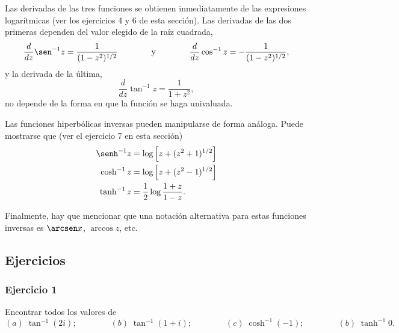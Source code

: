 \documentclass[a4paper]{report}
\begin{document}
Las derivadas de las tres funciones se obtienen inmediatamente de las expresiones logarítmicas (ver los ejercicios 4 y 6 de esta sección). Las derivadas de las dos primeras dependen del valor elegido de la raíz cuadrada,
\begin{equation}\label{eq:inverse_trigonometric_derivatives_sin_cos}
 \frac{d}{dz}\sen^{-1}z=\frac{1}{(1-z^2)^{1/2}}
 \qquad\qquad\textrm{y}\qquad\qquad
 \frac{d}{dz}\cos^{-1}z=-\frac{1}{(1-z^2)^{1/2}}, 
\end{equation}
y la derivada de la última,
\begin{equation}\label{eq:inverse_trigonometric_derivatives_tan}
 \frac{d}{dz}\tan^{-1}z=\frac{1}{1+z^2}, 
\end{equation}
no depende de la forma en que la función se haga univaluada.

Las funciones hiperbólicas inversas pueden manipularse de forma análoga. Puede mostrarse que (ver el ejercicio 7 en esta sección)
\begin{align}
 \senh^{-1}z&=\log\left[z+(z^2+1)^{1/2}\right]\label{eq:inverse_trigonometric_sinh_log}\\
 \cosh^{-1}z&=\log\left[z+(z^2-1)^{1/2}\right]\label{eq:inverse_trigonometric_cosh_log}\\
 \tanh^{-1}z&=\frac{1}{2}\log\frac{1+z}{1-z}.\label{eq:inverse_trigonometric_tanh_log}
\end{align}

Finalmente, hay que mencionar que una notación alternativa para estas funciones inversas es 
\(\arcsen x\), \(\arccos z\), etc.

\subsection*{Ejercicios}

\subsubsection{Ejercicio 1}

Encontrar todos los valores de
\[
 (\textit{a})\;\tan^{-1}(2i);\qquad\qquad (\textit{b})\;\tan^{-1}(1+i);
 \qquad\qquad (\textit{c})\;\cosh^{-1}(-1);\qquad\qquad (\textit{b})\;\tanh^{-1}0.
\]
\end{document}
